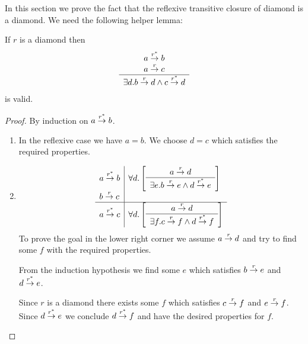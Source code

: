 In this section we prove the fact that the reflexive transitive closure of
diamond is a diamond. We need the following helper lemma:

\begin{lemma}
    \label{StripeLemma1}
    If $r$ is a diamond then
    $$
    \begin{array}{c} 
        a \stackrel{r^*}{\to} b
        \\
        a \stackrel{r}{\to} c
     \\ \hline 
        \exists d. b \stackrel{r}{\to} d \land c \stackrel{r^*}{\to} d
    \end{array}
    $$
    is valid.

    \begin{proof}
        By induction on $a \stackrel{r^*}{\to} b$.

        \begin{enumerate}
        \item In the reflexive case we have $a = b$. We choose $d = c$ which
        satisfies the required properties.

        \item
        $$
        \begin{array}{l|l}
            a \stackrel{r^*}{\to} b
            &
            \forall d.
            \left[
            \begin{array}{c} 
                a \stackrel{r}{\to} d
             \\ \hline 
                \exists e. b \stackrel{r}{\to} e \land d \stackrel{r^*}{\to} e
            \end{array}
            \right]
            \\
            b \stackrel{r}{\to} c
            \\
            \hline
            a \stackrel{r^*}{\to} c
            &
            \forall d.
            \left[
            \begin{array}{c} 
                a \stackrel{r}{\to} d
             \\ \hline 
                \exists f. c \stackrel{r}{\to} f \land d \stackrel{r^*}{\to} f
            \end{array}
            \right]
        \end{array}
        $$
        To prove the goal in the lower right corner we assume $a \stackrel{r}{\to} d$ and
        try to find some $f$ with the required properties.

        From the induction hypothesis we find some $e$ which satisfies $b \stackrel{r}{\to} e$ and $d \stackrel{r^*}{\to} e$.

        Since $r$ is a diamond there exists some $f$ which satisfies $c \stackrel{r}{\to}
        f$ and $e \stackrel{r}{\to} f$. Since $d \stackrel{r^*}{\to} e$ we conclude $d
        \stackrel{r^*}{\to} f$ and have the desired properties for $f$.
        \end{enumerate}
    \end{proof}

\end{lemma}



